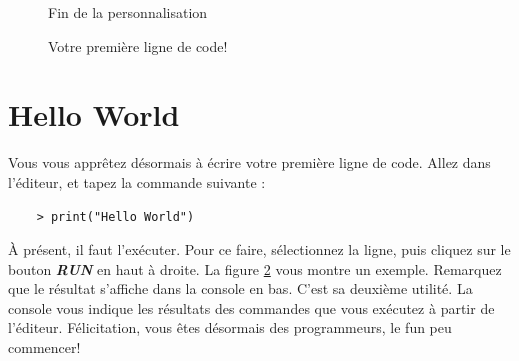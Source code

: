 \documentclass[10.5pt,a4paper]{article}
\begin{document}
\begin{figure}[H]
  \centering
  \caption{Fin de la personnalisation}
  \label{rstudio3}
\end{figure}

\begin{figure}[H]
  \centering
  \caption{Votre première ligne de code!}
  \label{rstudio4}
\end{figure}


\section{Hello World}

Vous vous apprêtez désormais à écrire votre première ligne de code. Allez dans l'éditeur, et tapez la commande suivante :
    \begin{lstlisting}
    > print("Hello World")
    \end{lstlisting}
À présent, il faut l'exécuter. Pour ce faire, sélectionnez la ligne, puis cliquez sur le bouton \textit{\textbf{RUN}} en haut à droite. La figure \ref{rstudio4} vous montre un exemple. Remarquez que le résultat s'affiche dans la console en bas. C'est sa deuxième utilité. La console vous indique les résultats des commandes que vous exécutez à partir de l'éditeur. Félicitation, vous êtes désormais des programmeurs, le fun peu commencer! 
\end{document}
